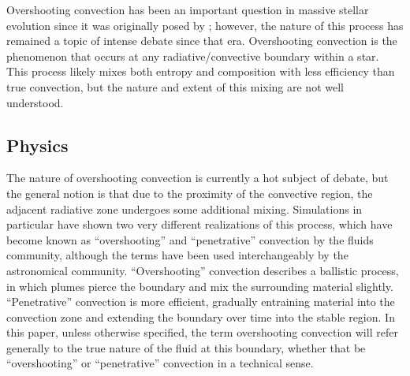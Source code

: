 Overshooting convection has been an important question in massive stellar evolution since it was originally posed by \citet{Saslaw1965}; however, the nature of this process has remained a topic of intense debate since that era.
	Overshooting convection is the phenomenon that occurs at any radiative/convective boundary within a star.
	This process likely mixes both entropy and composition with less efficiency than true convection, but the nature and extent of this mixing are not well understood.

\subsection{Physics} %
\label{sub:intro:osht:physics}

	The nature of overshooting convection is currently a hot subject of debate, but the general notion is that due to the proximity of the convective region, the adjacent radiative zone undergoes some additional mixing.
		Simulations \citep[e.g.][]{Brummell2002,Meakin2007} in particular have shown two very different realizations of this process, which have become known as ``overshooting'' and ``penetrative'' convection by the fluids community, although the terms have been used interchangeably by the astronomical community.
		``Overshooting'' convection describes a ballistic process, in which plumes pierce the boundary and mix the surrounding material slightly.
		``Penetrative'' convection is more efficient, gradually entraining material into the convection zone and extending the boundary over time into the stable region.
		In this paper, unless otherwise specified, the term overshooting convection will refer generally to the true nature of the fluid at this boundary, whether that be ``overshooting'' or ``penetrative'' convection in a technical sense.

